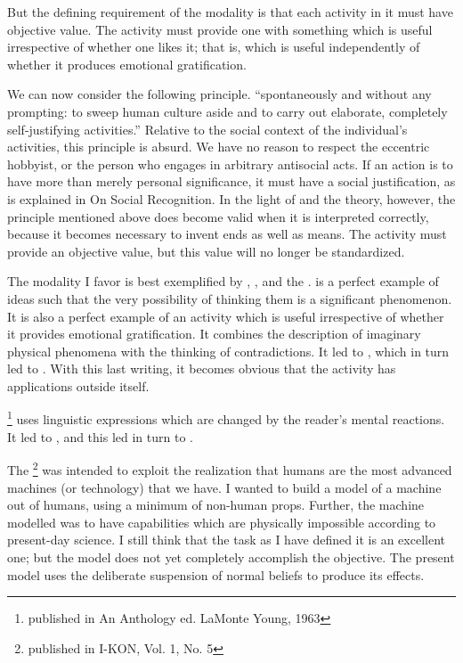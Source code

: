 But the defining requirement of the modality is that each activity in it 
must have objective value. The activity must provide one with something 
which is useful irrespective of whether one likes it; that is, which is useful 
independently of whether it produces emotional gratification. 

We can now consider the following principle. \enquote{spontaneously and 
without any prompting: to sweep human culture aside and to carry out 
elaborate, completely self-justifying activities.} Relative to the social context 
of the individual's activities, this principle is absurd. We have no reason to 
respect the eccentric hobbyist, or the person who engages in arbitrary 
antisocial acts. If an action is to have more than merely personal significance, 
it must have a social justification, as is explained in On Social Recognition. 
In the light of  and the  theory, however, 
the principle mentioned above does become valid when it is interpreted 
correctly, because it becomes necessary to invent ends as well as means. The 
activity must provide an objective value, but this value will no longer be 
standardized. 

The modality I favor is best exemplified by ,
, and the . 
 is a perfect example of ideas such that the very 
possibility of thinking them is a significant phenomenon. It is also a perfect example of an 
activity which is useful irrespective of whether it provides emotional 
gratification. It combines the description of imaginary physical phenomena 
with the thinking of contradictions. It led to , which in turn led to .
With this last writing, it becomes obvious that the activity has applications 
outside itself. 

\footnote{published in An Anthology ed. LaMonte Young, 1963}
uses linguistic expressions which are changed by the reader's mental 
reactions. It led to , and this led 
in turn to .

The \footnote{published in I-KON, Vol. 1, No. 5} 
was intended to exploit the realization that humans are the most 
advanced machines (or technology) that we have. I wanted to build a model 
of a machine out of humans, using a minimum of non-human props. Further, 
the machine modelled was to have capabilities which are physically 
impossible according to present-day science. I still think that the task as I 
have defined it is an excellent one; but the model does not yet completely 
accomplish the objective. The present model uses the deliberate suspension 
of normal beliefs to produce its effects. 

